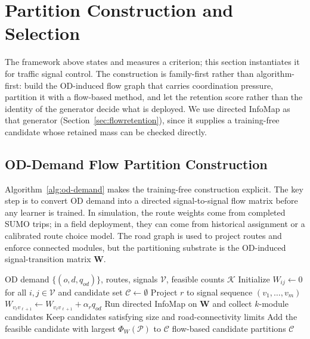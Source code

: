 \documentclass[journal]{IEEEtran}
\theoremstyle{definition}
\begin{document}
\section{Partition Construction and Selection}
\label{sec:construction}

The framework above states and measures a criterion; this section instantiates it for traffic signal control. The construction is family-first rather than algorithm-first: build the OD-induced flow graph that carries coordination pressure, partition it with a flow-based method, and let the retention score rather than the identity of the generator decide what is deployed. We use directed InfoMap as that generator (Section~\ref{sec:flowretention}), since it supplies a training-free candidate whose retained mass can be checked directly.

\subsection{OD-Demand Flow Partition Construction}
\label{sec:odconstruction}

Algorithm~\ref{alg:od-demand} makes the training-free construction explicit. The key step is to convert OD demand into a directed signal-to-signal flow matrix before any learner is trained. In simulation, the route weights come from completed SUMO trips; in a field deployment, they can come from historical assignment or a calibrated route choice model. The road graph is used to project routes and enforce connected modules, but the partitioning substrate is the OD-induced signal-transition matrix $\mathbf{W}$.

\begin{algorithm}[t]
    \footnotesize
    \caption{OD-induced route-flow partition construction}
    \label{alg:od-demand}
    \begin{algorithmic}[1]
        \Require OD demand $\{(o,d,q_{od})\}$, routes, signals $\mathcal{V}$, feasible counts $\mathcal{K}$
        \State Initialize $W_{ij}\gets0$ for all $i,j\in\mathcal{V}$ and candidate set $\mathcal{C}\gets\emptyset$
        \State Project $r$ to signal sequence $(v_1,\ldots,v_m)$
        \State $W_{v_\ell v_{\ell+1}}\gets W_{v_\ell v_{\ell+1}}+\alpha_r q_{od}$
        \EndFor
        \EndFor
        \EndFor
        \State Run directed InfoMap on $\mathbf{W}$ and collect $k$-module candidates
        \State Keep candidates satisfying size and road-connectivity limits
        \State Add the feasible candidate with largest $\Phi_W(\mathcal{P})$ to $\mathcal{C}$
        \EndFor
        \State \Return flow-based candidate partitions $\mathcal{C}$
    \end{algorithmic}
\end{algorithm}
\end{document}

